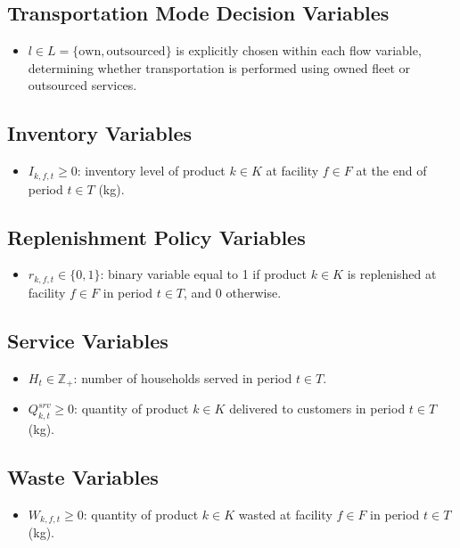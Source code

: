 \documentclass[12pt]{article}
\begin{document}
\subsection{Transportation Mode Decision Variables}
\begin{itemize}
    \item $l \in L = \{\text{own}, \text{outsourced}\}$ is explicitly chosen within each flow variable, determining whether transportation is performed using owned fleet or outsourced services.
\end{itemize}

\subsection{Inventory Variables}
\begin{itemize}
    \item $I_{k,f,t} \geq 0$: inventory level of product $k \in K$ at facility $f \in F$ at the end of period $t \in T$ (kg).
\end{itemize}

\subsection{Replenishment Policy Variables}
\begin{itemize}
    \item $r_{k,f,t} \in \{0,1\}$: binary variable equal to 1 if product $k \in K$ is replenished at facility $f \in F$ in period $t \in T$, and 0 otherwise.
\end{itemize}

\subsection{Service Variables}
\begin{itemize}
    \item $H_t \in \mathbb{Z}_{+}$: number of households served in period $t \in T$.

    \item $Q^{srv}_{k,t} \geq 0$: quantity of product $k \in K$ delivered to customers in period $t \in T$ (kg).
\end{itemize}

\subsection{Waste Variables}
\begin{itemize}
    \item $W_{k,f,t} \geq 0$: quantity of product $k \in K$ wasted at facility $f \in F$ in period $t \in T$ (kg).
\end{itemize}
\end{document}
